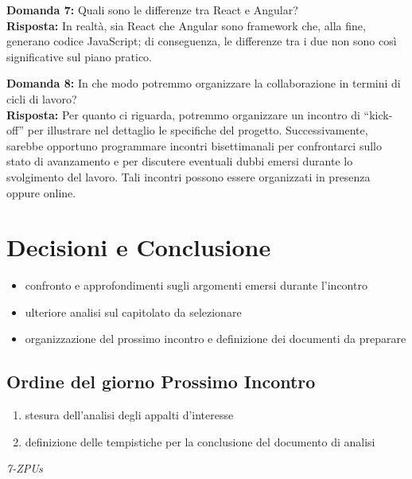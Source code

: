 \documentclass[a4paper,12pt]{article}
\begin{document}
\vspace{2em}

\textbf{Domanda 7:} Quali sono le differenze tra React e Angular?\\[0.5em]
\textbf{Risposta:} In realtà, sia React che Angular sono framework che, alla fine, generano codice JavaScript; di conseguenza, le differenze tra i due non sono così significative sul piano pratico.

\vspace{2em}

\textbf{Domanda 8:} In che modo potremmo organizzare la collaborazione in termini di cicli di lavoro?\\[0.5em]
\textbf{Risposta:} Per quanto ci riguarda, potremmo organizzare un incontro di “kick-off” per illustrare nel dettaglio le specifiche del progetto. Successivamente, sarebbe opportuno programmare incontri bisettimanali per confrontarci sullo stato di avanzamento e per discutere eventuali dubbi emersi durante lo svolgimento del lavoro. Tali incontri possono essere organizzati in presenza oppure online.


\vspace{0.5cm}
\section{Decisioni e Conclusione}
\begin{itemize}
    \item confronto e approfondimenti sugli argomenti emersi durante l'incontro
    \item ulteriore analisi sul capitolato da selezionare
    \item organizzazione del prossimo incontro e definizione dei documenti da preparare
\end{itemize}

\subsection{Ordine del giorno Prossimo Incontro}
\begin{enumerate}
    \item stesura dell'analisi degli appalti d'interesse
    \item definizione delle tempistiche per la conclusione del documento di analisi
\end{enumerate}

\vfill
\begin{flushright}
    \textit{7-ZPUs}
\end{flushright}
\end{document}
